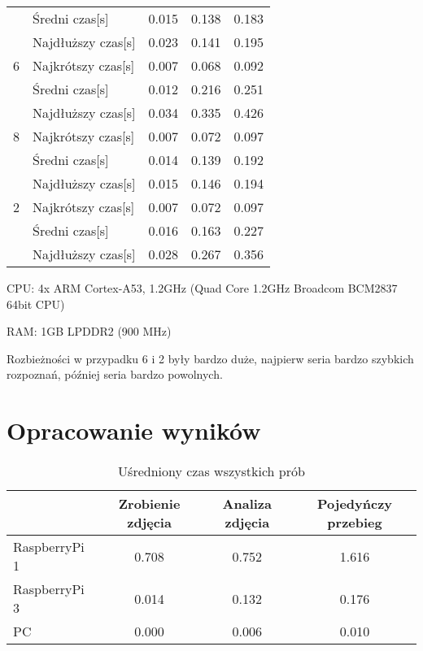 \begin{table}[H]
\begin{threeparttable}
\begin{tabular}{|l|l|ccc|}
            & Średni czas[s] & 0.015 & 0.138 & 0.183 \\
            & Najdłuższy czas[s] & 0.023 & 0.141 & 0.195 \\
            \midrule
            6 & Najkrótszy czas[s] & 0.007 & 0.068 & 0.092 \\
            & Średni czas[s] & 0.012 & 0.216 & 0.251 \\
            & Najdłuższy czas[s] & 0.034 & 0.335 & 0.426 \\
            \midrule
            8 & Najkrótszy czas[s] & 0.007 & 0.072 & 0.097 \\
            & Średni czas[s] & 0.014 & 0.139 & 0.192 \\
            & Najdłuższy czas[s] & 0.015 & 0.146 & 0.194 \\
            \midrule
            2 & Najkrótszy czas[s] & 0.007 & 0.072 & 0.097 \\
            & Średni czas[s] & 0.016 & 0.163 & 0.227 \\
            & Najdłuższy czas[s] & 0.028 & 0.267 & 0.356 \\
            \bottomrule
        \end{tabular}
        \begin{tablenotes}
            \item CPU: 4x ARM Cortex-A53, 1.2GHz (Quad Core 1.2GHz Broadcom BCM2837 64bit CPU)
            \item RAM: 1GB LPDDR2 (900 MHz)
            \item Rozbieżności w przypadku 6 i 2 były bardzo duże, najpierw seria bardzo szybkich rozpoznań,
            później seria bardzo powolnych.
        \end{tablenotes}
    \end{threeparttable}
\end{table}

\section{Opracowanie wyników}\label{sec:performance_results_preparation}

\begin{table}[H]
    \centering
    \begin{threeparttable}
        \caption{Uśredniony czas wszystkich prób}
        \begin{tabular}{|lccc|}
            \toprule
            & Zrobienie zdjęcia & Analiza zdjęcia & Pojedyńczy przebieg \\
            \midrule
            RaspberryPi 1 & 0.708 & 0.752 & 1.616 \\
            RaspberryPi 3 & 0.014 & 0.132 & 0.176 \\
            PC & 0.000 & 0.006 & 0.010 \\
            \bottomrule
        \end{tabular}
    \end{threeparttable}
\end{table}

